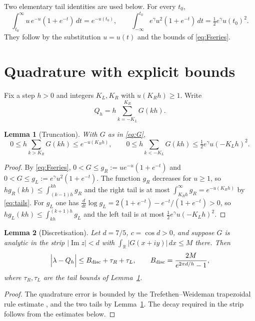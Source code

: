 \documentclass[11pt,a4paper]{article}
\newtheorem{lemma}{Lemma}
\theoremstyle{remark}
\newcommand{\lam}{\lambda}
\newcommand{\R}{\mathbb{R}}
\begin{document}
Two elementary tail identities are used below. For every $t_0$,
\begin{equation}
  \int_{t_0}^{\infty}u\,e^{-u}(1+e^{-t})\,dt=e^{-u(t_0)},\qquad
  \int_{-\infty}^{t_0}e^{\gamma}u^2(1+e^{-t})\,dt
  =\tfrac12 e^{\gamma}u(t_0)^2 .
  \label{eq:tails}
\end{equation}
They follow by the substitution $u=u(t)$ and the bounds of
\eqref{eq:Fseries}.

\section{Quadrature with explicit bounds}

Fix a step $h>0$ and integers $K_L,K_R$ with $u(K_Rh)\ge1$. Write
\begin{equation}
  Q_h=h\sum_{k=-K_L}^{K_R}G(kh).
\end{equation}

\begin{lemma}[Truncation]
\label{lem:tail}
With $G$ as in \eqref{eq:G},
\begin{equation}
  0\le h\!\!\sum_{k>K_R}\!G(kh)\le e^{-u(K_Rh)},\qquad
  0\le h\!\!\sum_{k<-K_L}\!G(kh)\le \tfrac12 e^{\gamma}u(-K_Lh)^2 .
\end{equation}
\end{lemma}

\begin{proof}
By \eqref{eq:Fseries}, $0<G\le g_R:=ue^{-u}(1+e^{-t})$ and
$0<G\le g_L:=e^\gamma u^2(1+e^{-t})$. The function $g_R$ decreases for
$u\ge1$, so $hg_R(kh)\le\int_{(k-1)h}^{kh}g_R$ and the right tail is at
most $\int_{K_Rh}^\infty g_R=e^{-u(K_Rh)}$ by \eqref{eq:tails}. For
$g_L$ one has $\frac{d}{dt}\log g_L=2(1+e^{-t})-e^{-t}/(1+e^{-t})>0$, so
$hg_L(kh)\le\int_{kh}^{(k+1)h}g_L$ and the left tail is at most
$\frac12e^\gamma u(-K_Lh)^2$.
\end{proof}

\begin{lemma}[Discretisation]
\label{lem:disc}
Let $d=7/5$, $c=\cos d>0$, and suppose $G$ is analytic in the strip
$|\operatorname{Im}z|<d$ with
$\int_\R|G(x+iy)|\,dx\le M$ there. Then
\begin{equation}
  \Bigl|\lam-Q_h\Bigr|
  \le B_{\mathrm{disc}}+\tau_R+\tau_L,
  \qquad
  B_{\mathrm{disc}}=\frac{2M}{e^{2\pi d/h}-1},
\end{equation}
where $\tau_R,\tau_L$ are the tail bounds of Lemma~\ref{lem:tail}.
\end{lemma}

\begin{proof}
The quadrature error is bounded by the Trefethen--Weideman trapezoidal
rule estimate \cite[Thm.~5.1]{TW2014}, and the two tails by
Lemma~\ref{lem:tail}. The decay required in the strip follows from the
estimates below.
\end{proof}
\end{document}
